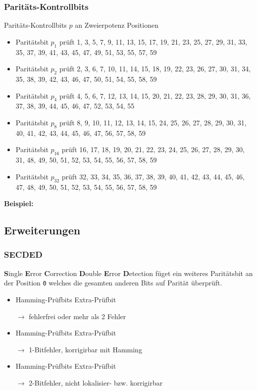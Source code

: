 \documentclass
[
	8pt,		%
	ngerman,	%
	a4paper,	%
	landscape,	%
	final		%
]{extarticle}
\newcommand{\cmark}{\textcolor{cmark}{\ding{51}}}
\newcommand{\xmark}{\textcolor{xmark}{\ding{55}}}
\newcommand*\example{\par\vspace{\abovedisplayskip}\textbf{Beispiel:}\par}
\newcommand{\includefigure}[1]{\begin{center}\end{center}}
\begin{document}
\begin{multicols*}{4}
\subsubsection*{Paritäts-Kontrollbits}
Paritäts-Kontrollbits $p$ an Zweierpotenz Positionen
\begin{itemize}
	\item Paritätsbit $p_{1}$ prüft 1, 3, 5, 7, 9, 11, 13, 15, 17, 19, 21, 23, 25, 27, 29, 31, 33, 35, 37, 39, 41, 43, 45, 47, 49, 51, 53, 55, 57, 59
	\item Paritätsbit $p_{2}$ prüft 2, 3, 6, 7, 10, 11, 14, 15, 18, 19, 22, 23, 26, 27, 30, 31, 34, 35, 38, 39, 42, 43, 46, 47, 50, 51, 54, 55, 58, 59
	\item Paritätsbit $p_{4}$ prüft 4, 5, 6, 7, 12, 13, 14, 15, 20, 21, 22, 23, 28, 29, 30, 31, 36, 37, 38, 39, 44, 45, 46, 47, 52, 53, 54, 55
	\item Paritätsbit $p_{8}$ prüft 8, 9, 10, 11, 12, 13, 14, 15, 24, 25, 26, 27, 28, 29, 30, 31, 40, 41, 42, 43, 44, 45, 46, 47, 56, 57, 58, 59
	\item Paritätsbit $p_{16}$ prüft 16, 17, 18, 19, 20, 21, 22, 23, 24, 25, 26, 27, 28, 29, 30, 31, 48, 49, 50, 51, 52, 53, 54, 55, 56, 57, 58, 59
	\item Paritätsbit $p_{32}$ prüft 32, 33, 34, 35, 36, 37, 38, 39, 40, 41, 42, 43, 44, 45, 46, 47, 48, 49, 50, 51, 52, 53, 54, 55, 56, 57, 58, 59
\end{itemize}

\example
\includefigure{./Documents/Graphics/Hamming-Abbildung-2.tex}
\subsection{Erweiterungen}
\subsubsection*{SECDED}
\textbf{S}ingle \textbf{E}rror \textbf{C}orrection \textbf{D}ouble \textbf{E}rror
\textbf{D}etection füget ein weiteres Paritätsbit an der Position \texttt{0} welches
die gesamten anderen Bits auf Parität überprüft. \par
\begin{itemize}
	\item Hamming-Prüfbits \cmark \quad Extra-Prüfbit \cmark\par
	      $\longrightarrow$ fehlerfrei oder mehr als 2 Fehler
	\item Hamming-Prüfbits \xmark \quad Extra-Prüfbit \xmark\par
	      $\longrightarrow$ 1-Bitfehler, korrigirbar mit Hamming
	\item Hamming-Prüfbits \xmark \quad Extra-Prüfbit \cmark\par
	      $\longrightarrow$ 2-Bitfehler, nicht lokalisier- bzw. korrigirbar
\end{itemize}



\end{multicols*}
\end{document}

